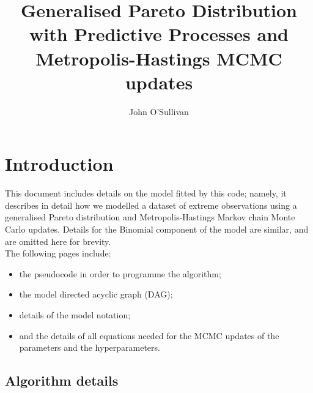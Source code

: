 \documentclass{article}
\begin{document}
\title{Generalised Pareto Distribution with Predictive Processes and Metropolis-Hastings MCMC updates}
\author{John O'Sullivan}
\maketitle

\section*{Introduction} \label{sec3:appenda} %
%
This document includes details on the model fitted by this code; namely, it describes in detail how we modelled a dataset of extreme observations using a generalised Pareto distribution and Metropolis-Hastings Markov chain Monte Carlo updates. Details for the Binomial component of the model are similar, and are omitted here for brevity.
\\

The following pages include:
\begin{itemize}
\itemsep-0.4em
\item the pseudocode in order to programme the algorithm;
\item the model directed acyclic graph (DAG);
\item details of the model notation;
\item and the details of all equations needed for the MCMC updates of the parameters and the hyperparameters.
\end{itemize}

\subsection*{Algorithm details}

\end{document}
